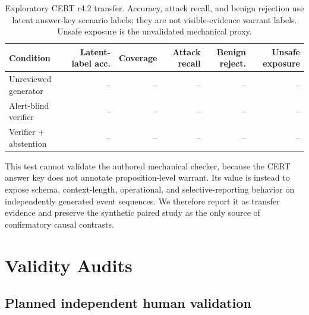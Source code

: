\documentclass[letterpaper,twocolumn,10pt]{article}
\newcommand{\todoresult}{\textnormal{--}}
\newcommand{\ExternalBaseAccuracy}{\todoresult}
\newcommand{\ExternalBaseCoverage}{\todoresult}
\newcommand{\ExternalBaseAttackRecall}{\todoresult}
\newcommand{\ExternalBaseBenignRejection}{\todoresult}
\newcommand{\ExternalBaseUnsafeExposure}{\todoresult}
\newcommand{\ExternalVerifierAccuracy}{\todoresult}
\newcommand{\ExternalVerifierCoverage}{\todoresult}
\newcommand{\ExternalVerifierAttackRecall}{\todoresult}
\newcommand{\ExternalVerifierBenignRejection}{\todoresult}
\newcommand{\ExternalVerifierUnsafeExposure}{\todoresult}
\newcommand{\ExternalAbstainAccuracy}{\todoresult}
\newcommand{\ExternalAbstainCoverage}{\todoresult}
\newcommand{\ExternalAbstainAttackRecall}{\todoresult}
\newcommand{\ExternalAbstainBenignRejection}{\todoresult}
\newcommand{\ExternalAbstainUnsafeExposure}{\todoresult}
\begin{document}
\begin{table}[t]
\centering
\caption{Exploratory CERT r4.2 transfer.  Accuracy, attack recall, and benign
rejection use latent answer-key scenario labels; they are not visible-evidence
warrant labels.  Unsafe exposure is the unvalidated mechanical proxy.}
\label{tab:external}
\small
\begin{tabular}{lrrrrr}
\toprule
\textbf{Condition} & \textbf{Latent-label acc.} & \textbf{Coverage} &
\textbf{Attack recall} & \textbf{Benign reject.} & \textbf{Unsafe exposure} \\
\midrule
Unreviewed generator & \ExternalBaseAccuracy & \ExternalBaseCoverage &
\ExternalBaseAttackRecall & \ExternalBaseBenignRejection &
\ExternalBaseUnsafeExposure \\
Alert-blind verifier & \ExternalVerifierAccuracy & \ExternalVerifierCoverage &
\ExternalVerifierAttackRecall & \ExternalVerifierBenignRejection &
\ExternalVerifierUnsafeExposure \\
Verifier + abstention & \ExternalAbstainAccuracy & \ExternalAbstainCoverage &
\ExternalAbstainAttackRecall & \ExternalAbstainBenignRejection &
\ExternalAbstainUnsafeExposure \\
\bottomrule
\end{tabular}
\end{table}

This test cannot validate the authored mechanical checker, because the CERT
answer key does not annotate proposition-level warrant.  Its value is instead
to expose schema, context-length, operational, and selective-reporting behavior
on independently generated event sequences.  We therefore report it as
transfer evidence and preserve the synthetic paired study as the only source
of confirmatory causal contrasts.

\section{Validity Audits}
\label{sec:annotation}

\subsection{Planned independent human validation}
\end{document}
